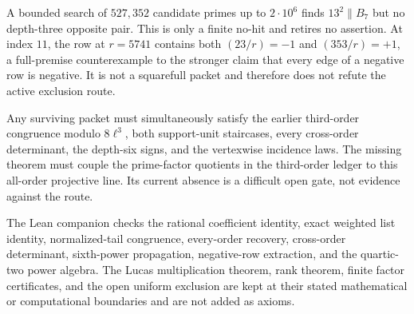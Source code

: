 A bounded search of $527{,}352$ candidate primes up to $2\cdot10^6$ finds
$13^2\parallel B_7$ but no depth-three opposite pair.  This is only a finite
no-hit and retires no assertion.  At index $11$, the row at $r=5741$ contains
both $(23/r)=-1$ and $(353/r)=+1$, a full-premise counterexample to the
stronger claim that every edge of a negative row is negative.  It is not a
squarefull packet and therefore does not refute the active exclusion route.

Any surviving packet must simultaneously satisfy the earlier third-order
congruence modulo $8\ell^3$, both support-unit staircases, every cross-order
determinant, the depth-six signs, and the vertexwise incidence laws.  The
missing theorem must couple the prime-factor quotients in the third-order
ledger to this all-order projective line.  Its current absence is a difficult
open gate, not evidence against the route.

The Lean companion checks the rational coefficient identity, exact weighted
list identity, normalized-tail congruence, every-order recovery, cross-order
determinant, sixth-power propagation, negative-row extraction, and the
quartic-two power algebra.  The Lucas multiplication theorem, rank theorem,
finite factor certificates, and the open uniform exclusion are kept at their
stated mathematical or computational boundaries and are not added as axioms.

